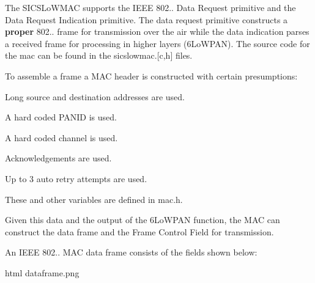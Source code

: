 The S\+I\+C\+S\+Lo\+W\+M\+AC supports the I\+E\+EE 802.. Data Request primitive and the Data Request Indication primitive. The data request primitive constructs a {\bfseries proper} 802.. frame for transmission over the air while the data indication parses a received frame for processing in higher layers (6\+Lo\+W\+P\+AN). The source code for the mac can be found in the sicslowmac.\mbox{[}c,h\mbox{]} files.

To assemble a frame a M\+AC header is constructed with certain presumptions\+:
\begin{DoxyEnumerate}
\item Long source and destination addresses are used.
\item A hard coded P\+A\+N\+ID is used.
\item A hard coded channel is used.
\item Acknowledgements are used.
\item Up to 3 auto retry attempts are used.
\end{DoxyEnumerate}

These and other variables are defined in mac.\+h.

Given this data and the output of the 6\+Lo\+W\+P\+AN function, the M\+AC can construct the data frame and the Frame Control Field for transmission.

An I\+E\+EE 802.. M\+AC data frame consists of the fields shown below\+: \begin{DoxyVerb}\image html dataframe.png
\end{DoxyVerb}


